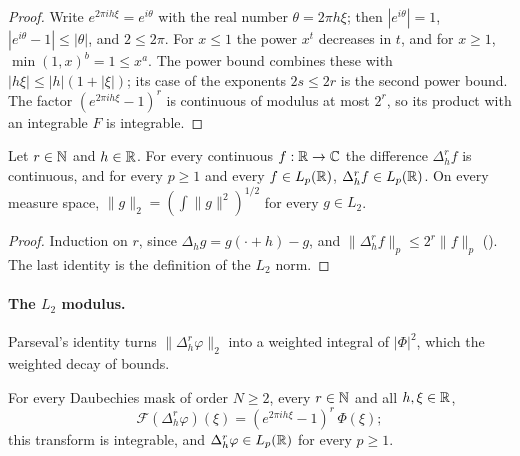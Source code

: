 \begin{proof}
\leanok
Write $e^{2\pi i h \xi} = e^{i\theta}$ with the real number $\theta = 2\pi h \xi$; then
$|e^{i\theta}| = 1$, $|e^{i\theta} - 1| \leq |\theta|$, and $2 \leq 2\pi$. For $x \leq 1$ the
power $x^t$ decreases in $t$, and for $x \geq 1$, $\min(1, x)^b = 1 \leq x^a$. The power bound
combines these with $|h \xi| \leq |h| (1 + |\xi|)$; its case of the exponents $2s \leq 2r$ is the
second power bound. The factor $(e^{2\pi i h \xi} - 1)^r$ is continuous of modulus at most $2^r$,
so its product with an integrable $F$ is integrable.
\end{proof}

\begin{lemma}[Differences in $L_p$]
\label{lem:daub-differences-lp}
\leanok
{}
Let $r \in \mathbb{N}$ and $h \in \mathbb{R}$. For every continuous $f : \mathbb{R} \to \mathbb{C}$ the difference
$\Delta_h^r f$ is continuous, and for every $p \geq 1$ and every $f \in L_p(\mathbb{R})$,
$\Delta_h^r f \in L_p(\mathbb{R})$. On every measure space, $\|g\|_2 = (\int \|g\|^2)^{1/2}$ for every
$g \in L_2$.
\end{lemma}

\begin{proof}
\leanok
{}
Induction on $r$, since $\Delta_h g = g(\cdot + h) - g$, and
$\|\Delta_h^r f\|_p \leq 2^r \|f\|_p$ (). The last identity is the
definition of the $L_2$ norm.
\end{proof}

\paragraph{The $L_2$ modulus.}
Parseval's identity turns $\|\Delta_h^r \varphi\|_2$ into a weighted integral of $|\Phi|^2$,
which the weighted decay of  bounds.

\begin{lemma}
\label{lem:daub-scaling-difference-fourier}
\leanok
{}
For every Daubechies mask of order $N \geq 2$, every $r \in \mathbb{N}$ and all $h, \xi \in \mathbb{R}$,
\[
  \mathcal F(\Delta_h^r \varphi)(\xi) = (e^{2\pi i h \xi} - 1)^r \, \Phi(\xi) ;
\]
this transform is integrable, and $\Delta_h^r \varphi \in L_p(\mathbb{R})$ for every $p \geq 1$.
\end{lemma}

